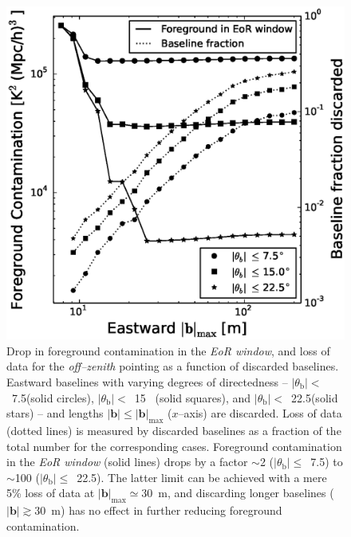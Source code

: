 \documentclass[preprint2,iop,numberedappendix]{emulateapj}
\begin{document}
\begin{figure}[htb]
\centering
\includegraphics[width=\linewidth]{fig14.eps}
\caption{Drop in foreground contamination in the {\it EoR window}, and loss of data for the {\it off--zenith} pointing as a function of discarded baselines. Eastward baselines with varying degrees of directedness -- $|\theta_\textrm{b}|<$~7.5\arcdeg (solid circles), $|\theta_\textrm{b}|<$~15\arcdeg~ (solid squares), and $|\theta_\textrm{b}|<$~22.5\arcdeg (solid stars) -- and lengths $|\boldsymbol{b}| \le |\boldsymbol{b}|_\textrm{max}$ ($x$--axis) are discarded. Loss of data (dotted lines) is measured by discarded baselines as a fraction of the total number for the corresponding cases. Foreground contamination in the {\it EoR window} (solid lines) drops by a factor $\sim$2 ($|\theta_\textrm{b}|\le$~7.5\arcdeg) to $\sim$100 ($|\theta_\textrm{b}|\le$~22.5\arcdeg). The latter limit can be achieved with a mere 5\% loss of data at $|\boldsymbol{b}|_\textrm{max}\simeq30$~m, and discarding longer baselines ($|\boldsymbol{b}|\gtrsim 30$~m) has no effect in further reducing foreground contamination. \label{fig:screening}}
\end{figure}
\end{document}

